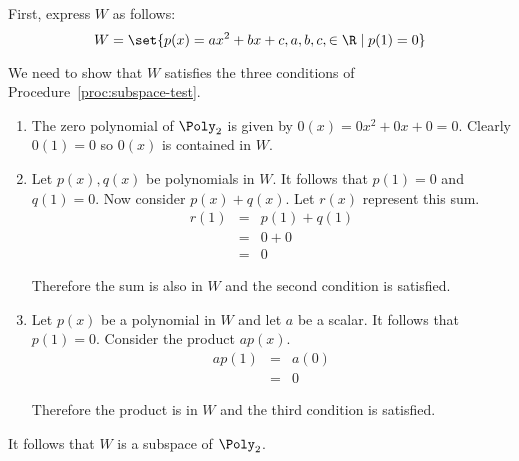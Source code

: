 \begin{solution}
  First, express $W$ as follows:
  \begin{equation*}
    W = \set{p(x) = ax^2 +bx +c, a,b,c, \in \R \mid p(1)  = 0 }
  \end{equation*}

  We need to show that $W$ satisfies the three conditions of
  Procedure~\ref{proc:subspace-test}.
  \begin{enumerate}
  \item The zero polynomial of $\Poly_2$ is given by
    $0(x) = 0x^2 + 0x + 0 = 0$. Clearly $0(1) = 0$ so $0(x)$ is
    contained in $W$.

  \item Let $p(x), q(x)$ be polynomials in $W$.  It follows that
    $p(1) = 0 $ and $q(1) = 0$. Now consider $p(x) + q(x)$. Let $r(x)$
    represent this sum.
    \begin{eqnarray*}
      r(1) &=& p(1) + q(1) \\
           &=& 0 + 0 \\
           &=& 0
    \end{eqnarray*}

    Therefore the sum is also in $W$ and the second condition is satisfied.

  \item Let $p(x)$ be a polynomial in $W$ and let $a$ be a scalar. It
    follows that $p(1) = 0$. Consider the product $ap(x)$.
    \begin{eqnarray*}
      ap(1) &=& a(0) \\
            &=& 0
    \end{eqnarray*}

    Therefore the product is in $W$ and the third condition is
    satisfied.
  \end{enumerate}

  It follows that $W$ is a subspace of $\Poly_2$.
\end{solution}

